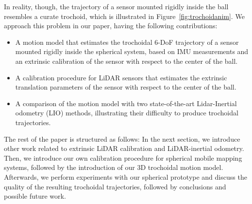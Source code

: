In reality, though, the trajectory of a sensor mounted rigidly inside the ball resembles a curate trochoid, which is illustrated in Figure~\ref{fig:trochoidanim}.
We approach this problem in our paper, having the following contributions:
\begin{itemize}
  \item A motion model that estimates the trochoidal 6-DoF trajectory of a sensor mounted rigidly inside the spherical system, based on IMU measurements and an extrinsic calibration of the sensor with respect to the center of the ball.
  \item A calibration procedure for LiDAR sensors that estimates the extrinsic translation parameters of the sensor with respect to the center of the ball.
  \item A comparison of the motion model with two state-of-the-art Lidar-Inertial odometry (LIO) methods, illustrating their difficulty to produce trochoidal trajectories.
\end{itemize}
The rest of the paper is structured as follows: 
In the next section, we introduce other work related to extrinsic LiDAR calibration and LiDAR-inertial odometry.
Then, we introduce our own calibration procedure for spherical mobile mapping systems, followed by the introduction of our 3D trochoidal motion model.
Afterwards, we perform experiments with our spherical prototype and discuss the quality of the resulting trochoidal trajectories, followed by conclusions and possible future work.
